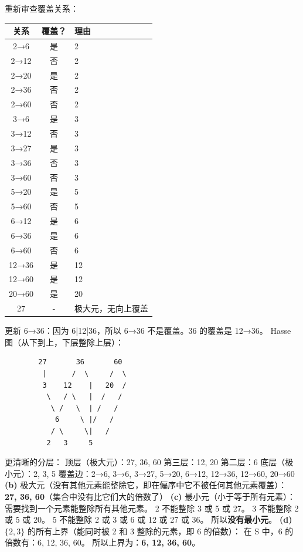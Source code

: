 \documentclass[10pt,a4paper,openany]{ctexbook}
\theoremstyle{definition}
\theoremstyle{remark}
\begin{document}
重新审查覆盖关系：
\begin{center}
\begin{tabular}{ccl}
\hline
关系 & 覆盖？ & 理由 \\ \hline
2→6 & 是 & 2\ \\
2→12 & 否 & 2\ \\
2→20 & 是 & 2\ \\
2→36 & 否 & 2\ \\
2→60 & 否 & 2\ \\
3→6 & 是 & 3\ \\
3→12 & 否 & 3\ \\
3→27 & 是 & 3\ \\
3→36 & 否 & 3\ \\
3→60 & 否 & 3\ \\
5→20 & 是 & 5\ \\
5→60 & 否 & 5\ \\
6→12 & 是 & 6\ \\
6→36 & 是 & 6\ \\
6→60 & 否 & 6\ \\
12→36 & 是 & 12\ \\
12→60 & 是 & 12\ \\
20→60 & 是 & 20\ \\
27 & - & 极大元，无向上覆盖 \\
\hline
\end{tabular}

\end{center}

更新 6→36：因为 6|12|36，所以 6→36 不是覆盖。36 的覆盖是 12→36。
Hasse 图（从下到上，下层整除上层）：
{\footnotesize\begin{verbatim}
        27       36       60
         |      /  \     /  \
         3    12    |   20  /
          \   / \   |  /   /
           \ /   \  | /   /
            6     \ |/   /
           / \     \|   /
          2   3     5
\end{verbatim}}

更清晰的分层：
顶层（极大元）：27, 36, 60
第三层：12, 20
第二层：6
底层（极小元）：2, 3, 5
覆盖边：2→6, 3→6, 3→27, 5→20, 6→12, 12→36, 12→60, 20→60
\textbf{(b)} 极大元（没有其他元素能整除它，即在偏序中它不被任何其他元素覆盖）：
\textbf{27, 36, 60}（集合中没有比它们大的倍数了）
\textbf{(c)} 最小元（小于等于所有元素）：
需要找到一个元素能整除所有其他元素。
2 不能整除 3 或 5 或 27。
3 不能整除 2 或 5 或 20。
5 不能整除 2 或 3 或 6 或 12 或 27 或 36。
所以\textbf{没有最小元}。
\textbf{(d)} $\{2, 3\}$ 的所有上界（能同时被 2 和 3 整除的元素，即 6 的倍数）：
在 S 中，6 的倍数有：6, 12, 36, 60。
所以上界为：\textbf{6, 12, 36, 60}。
\vspace{-2pt}
\end{document}
